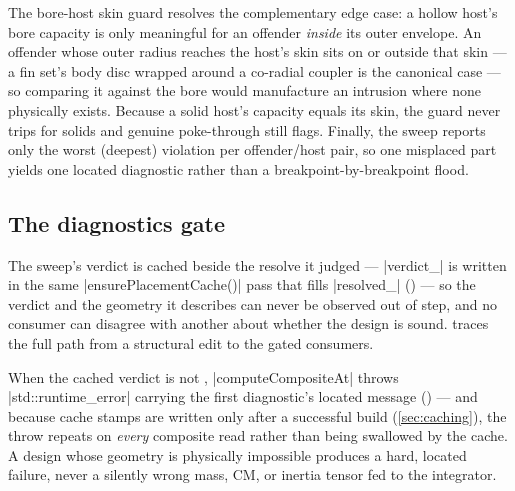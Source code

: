 The bore-host skin guard resolves the complementary edge case: a hollow host's bore capacity is
only meaningful for an offender \emph{inside} its outer envelope. An offender whose outer radius
reaches the host's skin sits on or outside that skin --- a fin set's body disc wrapped around a
co-radial coupler is the canonical case --- so comparing it against the bore would manufacture an
intrusion where none physically exists. Because a solid host's capacity equals its skin, the guard
never trips for solids and genuine poke-through still flags. Finally, the sweep reports only the
worst (deepest) violation per offender/host pair, so one misplaced part yields one located
diagnostic rather than a breakpoint-by-breakpoint flood.

\subsection{The diagnostics gate}\label{sec:placement-gate}

The sweep's verdict is cached beside the resolve it judged --- \cppinline|verdict_| is written in
the same \cppinline|ensurePlacementCache()| pass that fills \cppinline|resolved_|
() --- so the verdict and the geometry it describes can never
be observed out of step, and no consumer can disagree with another about whether the design is
sound.  traces the full path from a structural edit to the gated
consumers.


\begin{hardfail}
When the cached verdict is not \ok, \cppinline|computeCompositeAt| throws
\cppinline|std::runtime_error| carrying the first diagnostic's located message
() --- and because cache stamps are written only after a
successful build (\cref{sec:caching}), the throw repeats on \emph{every} composite read rather than
being swallowed by the cache. A design whose geometry is physically impossible produces a hard,
located failure, never a silently wrong mass, CM, or inertia tensor fed to the integrator.
\end{hardfail}

